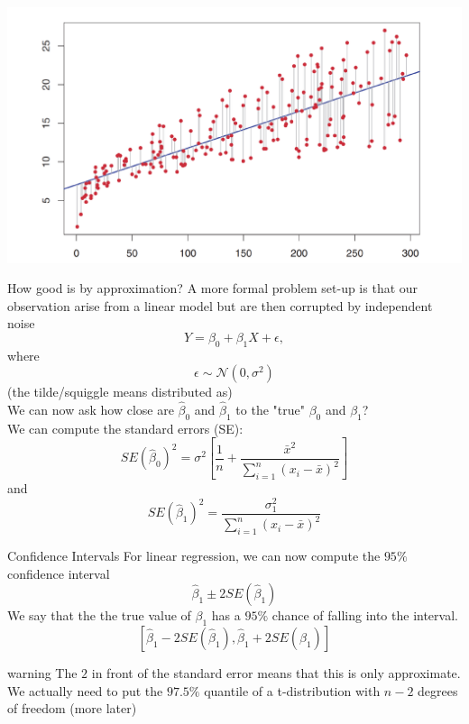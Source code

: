 \documentclass{bredelebeamer}
\begin{document}
\begin{frame}
\includegraphics[width=1\textwidth]{linearregression}
\end{frame}
\begin{frame}{How good is by approximation?}
A more formal problem set-up is that our observation arise from a linear model but are then corrupted by independent noise
\begin{equation}
Y = \beta_0 + \beta_1X + \epsilon,
\end{equation}
where 
\begin{equation}
\epsilon \sim \mathcal{N}(0, \sigma^2)
\end{equation}
(the tilde/squiggle means distributed as)
\\
We can now ask how close are $\hat{\beta}_0$ and $\hat{\beta}_1$ to the "true" $\beta_0$ and $\beta_1$?
\\
We can compute the standard errors (SE):
\begin{equation}
SE(\hat{\beta}_0)^2 = \sigma^2\left[\frac{1}{n} + \frac{\bar{x}^2}{\sum_{i = 1}^{n}(x_i - \bar{x})^2} \right]
\end{equation}
and
\begin{equation}
SE(\hat{\beta}_1)^2 =  \frac{\sigma_1^2}{\sum_{i =1 }^{n}(x_i - \bar{x})^2}
\end{equation}

\end{frame}

\begin{frame}{Confidence Intervals}
For linear regression, we can now compute the $95\%$ confidence interval
\begin{equation}
\hat{\beta}_1 \pm 2 SE(\hat{\beta}_1)
\end{equation}
We say that the the true value of $\beta_1$ has a $95 \%$ chance of falling into the interval.
\begin{equation}
\left[\hat{\beta}_1 - 2 SE(\hat{\beta}_1), \hat{\beta}_1 + 2 SE(\hat{\beta}_1)\right]
\end{equation}

\begin{alertblock}{warning}
	The $2$ in front of the standard error means that this is only approximate. We actually need to put the $97.5\%$ quantile of a t-distribution with $n-2$ degrees of freedom (more later)
\end{alertblock}

\end{frame}
\end{document}
